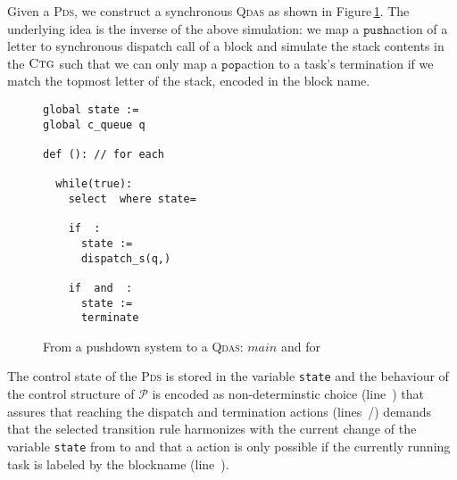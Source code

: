 \documentclass[runningheads,oribibl,]{article}
\newcommand{\Pp}{\ensuremath{\mathcal{P}}\xspace}
\newcommand{\cfont}[1]{\ensuremath{\mathtt{#1}}\xspace}
\newcommand{\main}{\ensuremath{\textit{main}}\xspace}
\newcommand{\pds}{\textsc{Pds}\xspace}
\newcommand{\qdas}{\textsc{Qdas}\xspace}
\newcommand{\ctg}{\ensuremath{\textsc{Ctg}}\xspace}
\newcommand{\push}{\ensuremath{\cfont{push}}}
\newcommand{\pop}{\ensuremath{\cfont{pop}}}
\begin{document}
Given a \pds , we construct a synchronous \qdas  as shown in
Figure\,\ref{fig:sim_pds}. The underlying idea is the inverse of
the above simulation: we map a \push action of a letter  to synchronous
dispatch call of a block  and simulate the stack contents in the \ctg such
that we can only map a \pop action to a task's termination if we match the
topmost letter of the stack, encoded in the block name.

\begin{figure}[t!]
  \centering
  \begin{minipage}{0.5\linewidth}
      \begin{lstlisting}
global state := 
global c_queue q

def (): // for each 

  while(true):
    select  where state=

    if  :
      state := 
      dispatch_s(q,)

    if  and  :
      state := 
      terminate
      \end{lstlisting}
    \end{minipage}
 \begin{minipage}[t]{0.5\linewidth}
\end{minipage}

    \caption{From a pushdown system  to a \qdas: \main and
     for  \label{fig:sim_pds}}
    \vspace{-4ex}
\end{figure}


The control state of the \pds is stored in the variable \texttt{state} and
the behaviour of the control structure of \Pp is encoded as non-determinstic
choice (line~) that assures that reaching the dispatch and termination actions
(lines~/) demands that the selected transition rule harmonizes with the
current change of the variable \texttt{state} from  to  and that a
 action is only possible if the currently running task is labeled
by the blockname  (line~).
\end{document}
